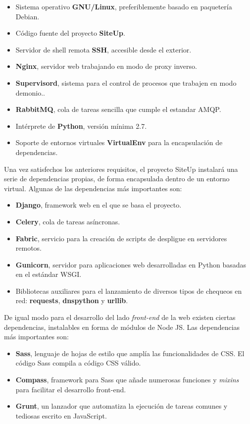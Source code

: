 \begin{itemize}
\item Sistema operativo \textbf{GNU/Linux}, preferiblemente basado en paquetería Debian.
\item Código fuente del proyecto \textbf{SiteUp}.
\item Servidor de shell remota \textbf{SSH}, accesible desde el exterior.
\item \textbf{Nginx}, servidor web trabajando en modo de proxy inverso.
\item \textbf{Supervisord}, sistema para el control de procesos que trabajen en modo demonio..
\item \textbf{RabbitMQ}, cola de tareas sencilla que cumple el estandar \ac{AMQP}.
\item Intérprete de \textbf{Python}, versión mínima 2.7.
\item Soporte de entornos virtuales \textbf{VirtualEnv} para la encapsulación de
  dependencias.
\end{itemize}

Una vez satisfechos los anteriores requisitos, el proyecto SiteUp instalará una
serie de dependencias propias, de forma encapsulada dentro de un entorno
virtual. Algunas de las dependencias más importantes son:

\begin{itemize}
\item \textbf{Django}, framework web en el que se basa el proyecto.
\item \textbf{Celery}, cola de tareas asíncronas.
\item \textbf{Fabric}, servicio para la creación de scripts de despligue en servidores remotos.
\item \textbf{Gunicorn}, servidor para aplicaciones web desarrolladas en Python
  basadas en el estándar WSGI.
\item Bibliotecas auxiliares para el lanzamiento de diversos tipos de chequeos
  en red: \textbf{requests}, \textbf{dnspython} y \textbf{urllib}.
\end{itemize}

De igual modo para el desarrollo del lado \textit{front-end} de la web existen
ciertas dependencias, instalables en forma de módulos de Node JS. Las
dependencias más importantes son:

\begin{itemize}
\item \textbf{Sass}, lenguaje de hojas de estilo que amplía las funcionalidades
  de CSS. El código Sass compila a código CSS válido.
\item \textbf{Compass}, framework para Sass que añade numerosas funciones y
  \textit{mixins} para facilitar el desarrollo front-end.
\item \textbf{Grunt}, un lanzador que automatiza la ejecución de tareas comunes
  y tediosas escrito en JavaScript.
\end{itemize}

